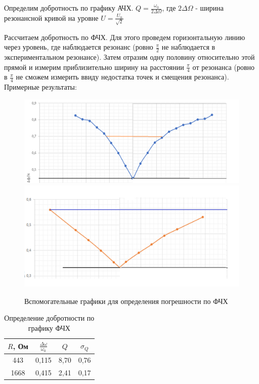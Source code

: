 \documentclass[a4paper, 12pt]{article}
\begin{document}
        Определим добротность по графику АЧХ. $Q = \frac{\omega_0}{2\Delta \Omega}$, где $2\Delta \Omega$ - ширина резонансной кривой на уровне $U = \frac{U_0}{\sqrt{2}}$

        Рассчитаем добротность по ФЧХ. Для этого проведем горизонтальную линию через уровень, где наблюдается резонанс (ровно $\frac{\pi}{2}$ не наблюдается в экспериментальном резонансе). Затем отразим одну половину относительно этой прямой и измерим приблизительно ширину на расстоянии $\frac{\pi}{4}$ от резонанса (ровно в $\frac{\pi}{4}$ не сможем измерить ввиду недостатка точек и смещения резонанса).
        Примерные результаты:

        \begin{figure}[h]
            \centering
            \includegraphics[width = \textwidth]{img/Gr6.png}
            \includegraphics[width = \textwidth]{img/Gr5.png}
            \caption{Вспомогательные графики для определения погрешности по ФЧХ}
        \end{figure}

        \begin{table}[h]
        \centering
        \begin{tabular}{|c|c|c|c|}
            \hline
            $R$, Ом & $\frac{\Delta \omega}{\omega_0}$ & $Q$ & $\sigma_{Q}$ \\ \hline
            443 & 0,115 & 8,70 & 0,76 \\ \hline
            1668 & 0,415 & 2,41 & 0,17 \\ \hline
        \end{tabular}
        \caption{Определение добротности по графику ФЧХ}
        \end{table}
\end{document}

